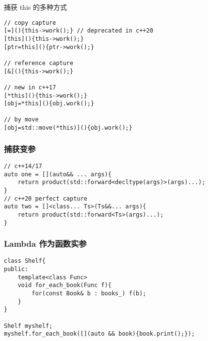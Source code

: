 \documentclass{article}
\begin{document}
捕获 this 的多种方式

\begin{verbatim}
// copy capture
[=](){this->work();} // deprecated in c++20
[this](){this->work();}
[ptr=this](){ptr->work();}

// reference capture
[&](){this->work();}

// new in c++17
[*this](){this->work();}
[obj=*this](){obj.work();}

// by move
[obj=std::move(*this)](){obj.work();}
\end{verbatim} 
    

\subsubsection{捕获变参}
\begin{verbatim}
// c++14/17 
auto one = [](auto&& ... args){
    return product(std::forward<decltype(args)>(args)...);
}
// c++20 perfect capture
auto two = []<class... Ts>(Ts&&... args){
    return product(std::forward<Ts>(args)...);
}
\end{verbatim} 


\subsubsection{Lambda 作为函数实参}
\begin{verbatim}
class Shelf{
public:
    template<class Func>
    void for_each_book(Func f){
        for(const Book& b : books_) f(b);
    }
}

Shelf myshelf;
myshelf.for_each_book([](auto && book){book.print();});
\end{verbatim} 


\end{document}

